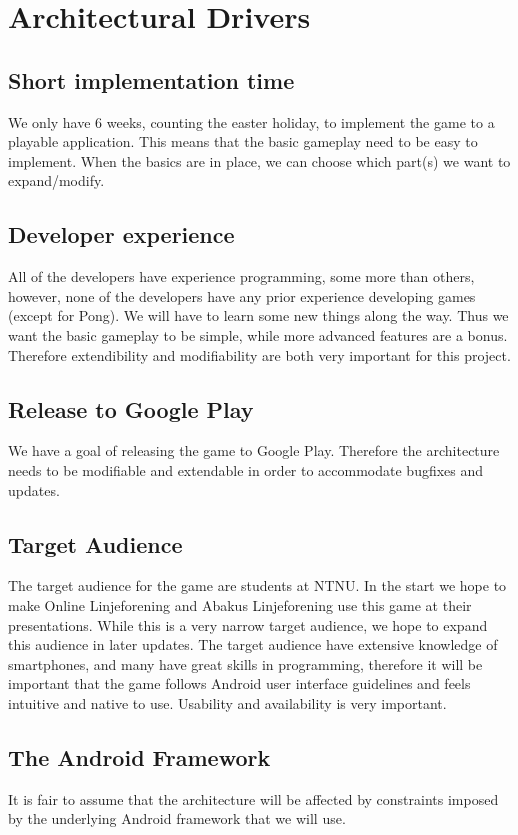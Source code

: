 \section{Architectural Drivers} 
\label{sec:architecturaldrivers}


\subsection{Short implementation time}
We only have 6 weeks, counting the easter holiday, to implement the game to a playable application. This means that the basic gameplay need to be easy to implement. When the basics are in place, we can choose which part(s) we want to expand/modify.

\subsection{Developer experience}
All of the developers have experience programming, some more than others, however, none of the developers have any prior experience developing games (except for Pong). We will have to learn some new things along the way. Thus we want the basic gameplay to be simple, while more advanced features are a bonus. Therefore extendibility and modifiability are both very important for this project.

\subsection{Release to Google Play}
We have a goal of releasing the game to Google Play. Therefore the architecture needs to be modifiable and extendable in order to accommodate bugfixes and updates. 

\subsection{Target Audience}
The target audience for the game are students at NTNU. In the start we hope to make Online Linjeforening and Abakus Linjeforening use this game at their presentations. While this is a very narrow target audience, we hope to expand this audience in later updates. The target audience have extensive knowledge of smartphones, and many have great skills in programming, therefore it will be important that the game follows Android user interface guidelines and feels intuitive and native to use. Usability and availability is very important.

\subsection{The Android Framework}
It is fair to assume that the architecture will be affected by constraints imposed by the underlying Android framework that we will use.
